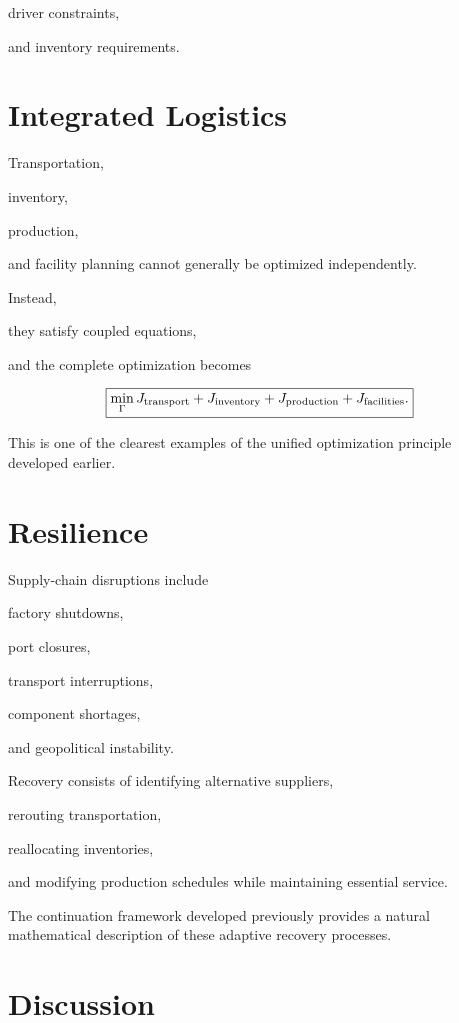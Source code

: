 \documentclass[11pt,fleqn]{book}
\numberwithin{equation}{chapter}
\theoremstyle{plain}
\theoremstyle{definition}
\theoremstyle{remark}
\begin{document}
driver constraints,

and inventory requirements.


\section{Integrated Logistics}

Transportation,

inventory,

production,

and facility planning cannot generally be optimized independently.

Instead,

they satisfy coupled equations,

and the complete optimization becomes

\[
\boxed{
\min_{\Gamma}
J_{\rm transport}
+
J_{\rm inventory}
+
J_{\rm production}
+
J_{\rm facilities}.
}
\]

This is one of the clearest examples of the unified optimization
principle developed earlier.


\section{Resilience}

Supply-chain disruptions include

factory shutdowns,

port closures,

transport interruptions,

component shortages,

and geopolitical instability.

Recovery consists of identifying alternative suppliers,

rerouting transportation,

reallocating inventories,

and modifying production schedules while maintaining essential service.

The continuation framework developed previously provides a natural
mathematical description of these adaptive recovery processes.


\section{Discussion}
\end{document}
